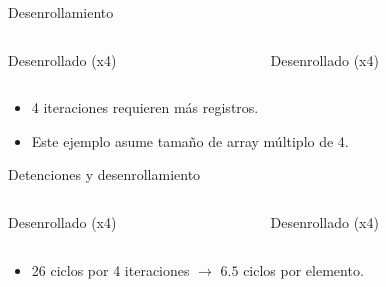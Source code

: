 \begin{frame}[t]{Desenrollamiento}

\begin{columns}

\begin{column}{.45\textwidth}
\begin{block}{Desenrollado (x4)}

\end{block}
\end{column}

\begin{column}{.45\textwidth}
\begin{block}{Desenrollado (x4)}

\end{block}
\end{column}

\end{columns}
\begin{itemize}
  \item 4 iteraciones requieren más registros.
  \item Este ejemplo asume tamaño de array múltiplo de 4.
\end{itemize}
\end{frame}

\begin{frame}[t,shrink=10]{Detenciones y desenrollamiento}

\begin{columns}[T]

\begin{column}{.45\textwidth}
\begin{block}{Desenrollado (x4)}

\end{block}
\end{column}

\begin{column}{.45\textwidth}
\begin{block}{Desenrollado (x4)}

\end{block}
\end{column}

\end{columns}
\begin{itemize}
  \item 26 ciclos por 4 iteraciones $\rightarrow$ $6.5$ ciclos por elemento.
\end{itemize}
\end{frame}

